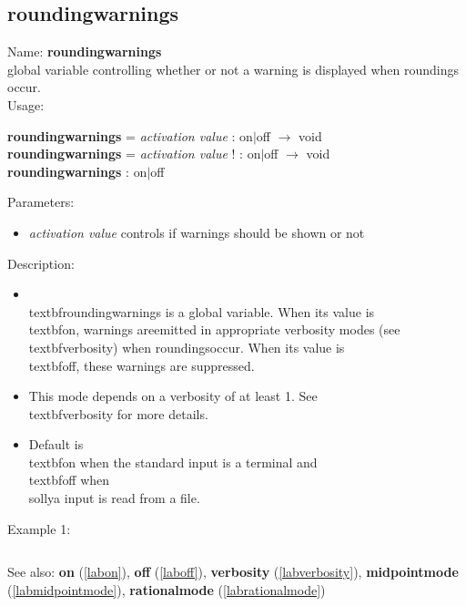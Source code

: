 \subsection{roundingwarnings}
\label{labroundingwarnings}
\noindent Name: \textbf{roundingwarnings}\\
global variable controlling whether or not a warning is displayed when roundings occur.\\
\noindent Usage: 
\begin{center}
\textbf{roundingwarnings} = \emph{activation value} : \textsf{on$|$off} $\rightarrow$ \textsf{void}\\
\textbf{roundingwarnings} = \emph{activation value} ! : \textsf{on$|$off} $\rightarrow$ \textsf{void}\\
\textbf{roundingwarnings} : \textsf{on$|$off}\\
\end{center}
Parameters: 
\begin{itemize}
\item \emph{activation value} controls if warnings should be shown or not
\end{itemize}
\noindent Description: \begin{itemize}

\item \\textbf{roundingwarnings} is a global variable. When its value is \\textbf{on}, warnings are\n   emitted in appropriate verbosity modes (see \\textbf{verbosity}) when roundings\n   occur.  When its value is \\textbf{off}, these warnings are suppressed.\n
\item This mode depends on a verbosity of at least 1. See\n   \\textbf{verbosity} for more details.\n
\item Default is \\textbf{on} when the standard input is a terminal and\n   \\textbf{off} when \\sollya input is read from a file.\n\end{itemize}
\noindent Example 1: 
\begin{center}\begin{minipage}{15cm}\begin{Verbatim}[frame=single]
\end{Verbatim}
\end{minipage}\end{center}
See also: \textbf{on} (\ref{labon}), \textbf{off} (\ref{laboff}), \textbf{verbosity} (\ref{labverbosity}), \textbf{midpointmode} (\ref{labmidpointmode}), \textbf{rationalmode} (\ref{labrationalmode})
